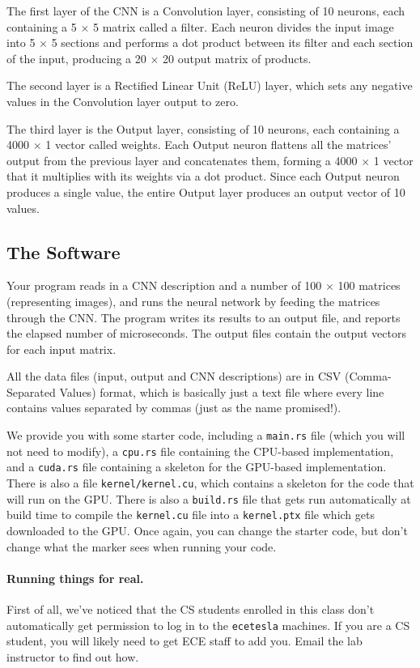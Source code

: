 The first layer of the CNN is a Convolution layer, consisting of 10 neurons, each containing a 5 $\times$ 5 matrix called a filter. Each neuron divides the input image into 5 $\times$ 5 sections and performs a dot product between its filter and each section of the input, producing a 20 $\times$ 20 output matrix of products.

The second layer is a Rectified Linear Unit (ReLU) layer, which sets any negative values in the Convolution layer output to zero.

The third layer is the Output layer, consisting of 10 neurons, each containing a 4000 $\times$ 1 vector called weights. Each Output neuron flattens all the matrices' output from the previous layer and concatenates them, forming a 4000 $\times$ 1 vector that it multiplies with its weights via a dot product. Since each Output neuron produces a single value, the entire Output layer produces an output vector of 10 values.

\subsection*{The Software}

Your program reads in a CNN description and a number of 100 $\times$ 100 matrices (representing images), and runs the neural network by feeding the matrices through the CNN. The program writes its results to an output file, and reports the elapsed number of microseconds. The output files contain the output vectors for each input matrix.

All the data files (input, output and CNN descriptions) are in CSV (Comma-Separated Values) format, which is basically just a text file where every line contains values separated by commas (just as the name promised!).

We provide you with some starter code, including a \texttt{main.rs} file (which you will not need to modify), a \texttt{cpu.rs} file containing the CPU-based implementation, and a \texttt{cuda.rs} file containing a skeleton for the GPU-based implementation. There is also a file \texttt{kernel/kernel.cu}, which contains a skeleton for the code that will run on the GPU. There is also a \texttt{build.rs} file that gets run automatically at build time to compile the \texttt{kernel.cu} file into a \texttt{kernel.ptx} file which gets downloaded to the GPU. Once again, you can change the starter code, but don't change what the marker sees when running your code.


\paragraph{Running things for real.}
First of all, we've noticed that the CS students enrolled in this class don't automatically get permission to log in to the \texttt{ecetesla} machines. If you are a CS student, you will likely need to get ECE staff to add you. Email the lab instructor to find out how.

